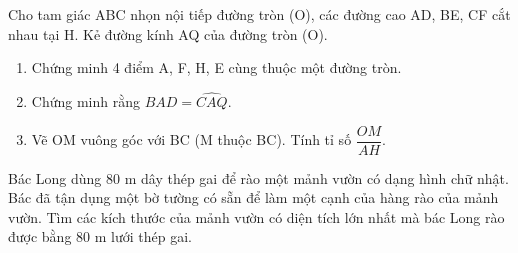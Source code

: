 \begin{ex} Cho tam giác ABC nhọn nội tiếp đường tròn (O), các đường cao AD, BE, CF cắt nhau tại H. Kẻ đường kính AQ của đường tròn (O).
	\begin{enumerate}
		\item[a)] Chứng minh 4 điểm A, F, H, E cùng thuộc một đường tròn.
		\item[b)] Chứng minh rằng $\widehat{BAD} = \widehat{CAQ}$.
		\item[c)] Vẽ OM vuông góc với BC (M thuộc BC). Tính tỉ số $\dfrac{OM}{AH}$.
	\end{enumerate}
\end{ex}

\begin{ex}
Bác Long dùng 80 m dây thép gai để rào một mảnh vườn có dạng hình chữ nhật. Bác đã tận dụng một bờ tường có sẵn để làm một cạnh của hàng rào của mảnh vườn. Tìm các kích thước của mảnh vườn có diện tích lớn nhất mà bác Long rào được bằng 80 m lưới thép gai.

\end{ex}

